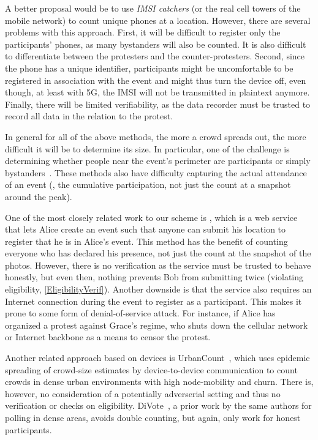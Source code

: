 A better proposal would be to use \emph{IMSI catchers} (or the real cell towers of the mobile network) to count unique phones at a location.
However, there are several problems with this approach.
First, it will be difficult to register only the participants' phones, as many 
bystanders will also be counted.
It is also difficult to differentiate between the protesters and the counter-protesters.
Second, since the phone has a unique identifier, participants might be uncomfortable to be registered in association with the event and might thus turn the device off, even though, at least with 5G, the IMSI will not be
transmitted in plaintext anymore. %
Finally, there will be limited verifiability, as the data recorder must be trusted to record all data in the relation to the protest.

In general for all of the above methods, the more a crowd spreads out, the more 
difficult it will be to determine its size.
In particular, one of the challenge is determining whether people near the event's perimeter are participants or simply bystanders~\cite{HowToEstimateCrowdSize}.
These methods also have difficulty capturing the actual attendance of an event (\ie, the cumulative participation, not just the count at a snapshot around the peak).

One of the most closely related work to our scheme is \citet{CrowdCount}, which is a web service that lets Alice create an event such that anyone can submit his location to register that he is in Alice's event.
This method has the benefit of counting everyone who has declared his presence, not just the count at the snapshot of the photos.
However, there is no verification as the service must be trusted to behave honestly, but even then, nothing prevents Bob from submitting twice (violating eligibility, \cref{EligibilityVerif}).
Another downside is that the service also requires an Internet connection during the event to register as a participant.
This makes it prone to some form of denial-of-service attack.
For instance, if Alice has organized a protest against Grace's regime, who shuts 
down the cellular network or Internet backbone as a means to censor the protest.

Another related approach based on devices is UrbanCount~\cite{UrbanCount}, which 
uses epidemic spreading of crowd-size estimates by device-to-device 
communication to count crowds in dense urban environments with high 
node-mobility and churn. There is, however, no consideration of a potentially 
adverserial setting and thus no verification or checks on eligibility. 
DiVote~\cite{DiVote}, a prior work by the same authors for polling in dense 
areas, avoids double counting, but again, only work for honest participants.


